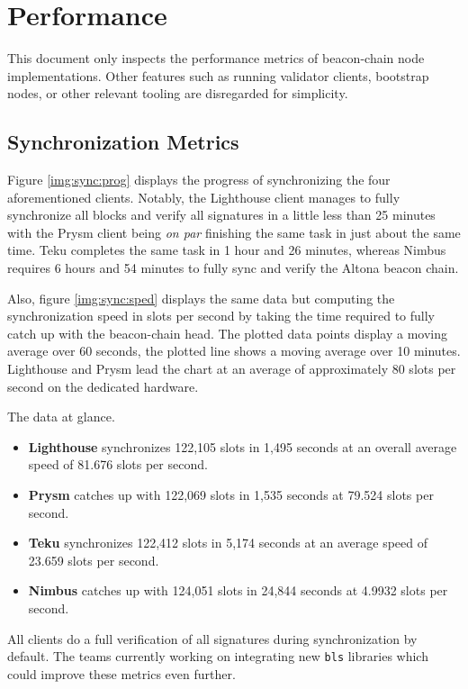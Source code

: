 \documentclass[twoside,twocolumn]{article}
\begin{document}
\section{Performance}
\label{sec:perf}
This document only inspects the performance metrics of beacon-chain node implementations. Other features such as running validator clients, bootstrap nodes, or other relevant tooling are disregarded for simplicity.

\subsection{Synchronization Metrics}
Figure \ref{img:sync:prog} displays the progress of synchronizing the four aforementioned clients. Notably, the Lighthouse client manages to fully synchronize all blocks and verify all signatures in a little less than 25 minutes with the Prysm client being \textit{on par} finishing the same task in just about the same time. Teku completes the same task in 1 hour and 26 minutes, whereas Nimbus requires 6 hours and 54 minutes to fully sync and verify the Altona beacon chain.\par

Also, figure \ref{img:sync:sped} displays the same data but computing the synchronization speed in slots per second by taking the time required to fully catch up with the beacon-chain head. The plotted data points display a moving average over 60 seconds, the plotted line shows a moving average over 10 minutes. Lighthouse and Prysm lead the chart at an average of approximately 80 slots per second on the dedicated hardware.\par

The data at glance.
\begin{itemize}
\item \textbf{Lighthouse} synchronizes 122,105 slots in 1,495 seconds at an overall average speed of 81.676 slots per second.
\item \textbf{Prysm} catches up with 122,069 slots in 1,535 seconds at 79.524 slots per second.
\item \textbf{Teku} synchronizes 122,412 slots in 5,174 seconds at an average speed of 23.659 slots per second.
\item \textbf{Nimbus} catches up with 124,051 slots in 24,844 seconds at 4.9932 slots per second.
\end{itemize}

All clients do a full verification of all signatures during synchronization by default. The teams currently working on integrating new \texttt{bls} libraries which could improve these metrics even further.\par
\end{document}
